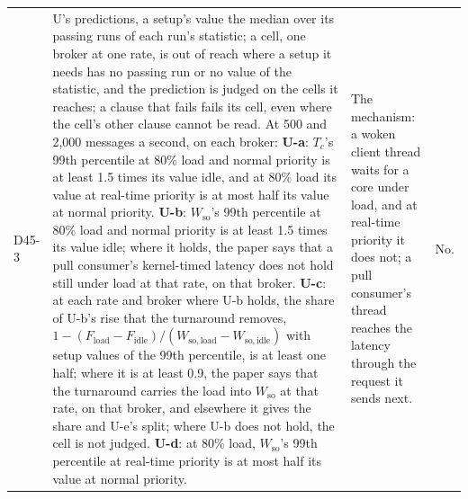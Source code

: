 \documentclass[11pt]{article}
\begin{document}
{\begin{longtable}{@{}p{1.1cm} >{\raggedright\arraybackslash}p{6.1cm} >{\raggedright\arraybackslash}p{6.0cm} >{\raggedright\arraybackslash}p{2.2cm}@{}}
D45-3 & U's predictions, a setup's value the median over its passing runs of each run's statistic; a cell, one broker at one rate, is out of reach where a setup it needs has no passing run or no value of the statistic, and the prediction is judged on the cells it reaches; a clause that fails fails its cell, even where the cell's other clause cannot be read. At 500 and 2,000 messages a second, on each broker: \textbf{U-a}: $T_c$'s 99th percentile at 80\% load and normal priority is at least 1.5 times its value idle, and at 80\% load its value at real-time priority is at most half its value at normal priority. \textbf{U-b}: $W_{\mathrm{so}}$'s 99th percentile at 80\% load and normal priority is at least 1.5 times its value idle; where it holds, the paper says that a pull consumer's kernel-timed latency does not hold still under load at that rate, on that broker. \textbf{U-c}: at each rate and broker where U-b holds, the share of U-b's rise that the turnaround removes, $1 - (F_{\mathrm{load}} - F_{\mathrm{idle}})/(W_{\mathrm{so,load}} - W_{\mathrm{so,idle}})$ with setup values of the 99th percentile, is at least one half; where it is at least 0.9, the paper says that the turnaround carries the load into $W_{\mathrm{so}}$ at that rate, on that broker, and elsewhere it gives the share and U-e's split; where U-b does not hold, the cell is not judged. \textbf{U-d}: at 80\% load, $W_{\mathrm{so}}$'s 99th percentile at real-time priority is at most half its value at normal priority. & The mechanism: a woken client thread waits for a core under load, and at real-time priority it does not; a pull consumer's thread reaches the latency through the request it sends next. & No. \\

\end{longtable}}
\end{document}
